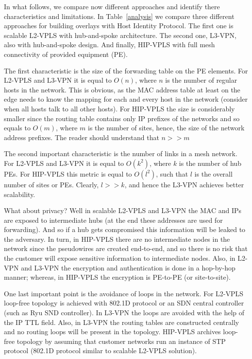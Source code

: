 In what follows, we compare now different approaches and identify there
characteristics and limitations. In Table~\ref{analysis} we 
compare three different approaches for building overlays with Host 
Identity Protocol. The first one is scalable L2-VPLS with hub-and-spoke
architecture. The second one, L3-VPN, also with hub-and-spoke 
design. And finally, HIP-VPLS with full mesh connectivity of provided equipment (PE).

The first characteristic is the size of the forwarding table on the PE elements. For 
L2-VPLS and L3-VPN it is equal to $O(n)$, where $n$ is the number of regular hosts in the
network. This is obvious, as the MAC address table at least on the edge needs to know
the mapping for each and every host in the network (consider when all hosts talk to 
all other hosts). For HIP-VPLS the size is considerably smaller since the routing table
contains only IP prefixes of the networks and so equals to $O(m)$, where $m$ is the number 
of sites, hence, the size of the network address prefixes. The reader should understand
that $n>>m$

The second important characteristic is the number of links in a mesh network. For L2-VPLS 
and L3-VPN it is equal to $O(k^2)$, where $k$ is the number of hub PEs. For HIP-VPLS
this metric is equal to $O(l^2)$, such that $l$ is the overall number of sites or PEs.
Clearly, $l>>k$, and hence the L3-VPN achieves better scalability.

What about privacy? Well in scalable L2-VPLS and L3-VPN the MAC and IPs are exposed to intermediate hubs 
(at the end these addresses are used for forwarding). And so if a hub gets compromised 
this information will be leaked to the adversary. In turn, in HIP-VPLS there are no intermediate nodes
in the network since the pseudowires are created end-to-end, and so there is no risk that the 
customer will expose sensitive information to intermediate nodes. Also, in L2-VPN and L3-VPN 
the encryption and authentication is done in a hop-by-hop manner; whereas, in HIP-VPLS the 
encryption is PE-to-PE (or site-to-site).

One last important point is the avoidance of loops in the network. For L2-VPLS loop-free topology
is achieved with 802.1D protocol or an SDN central controller (such as Ryu SND controller). 
In L3-VPN the loops are avoided with the help of the IP TTL field. Also, in L3-VPN the routing tables
are constructed centrally and no routing loops will be present in the topology. HIP-VPLS
archives loop-free topology by assuming that customer networks run an instance of STP protocol
(802.1D protocol similar to scalable L2-VPLS solution). 

